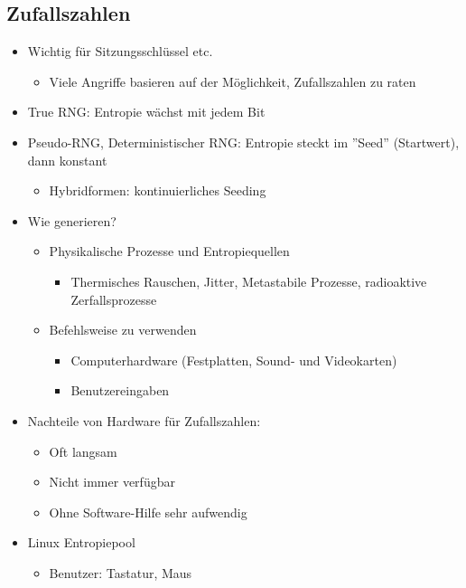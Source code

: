 \documentclass[openany]{book}
\begin{document}
\subsection{Zufallszahlen}

\begin{itemize}
    \item Wichtig für Sitzungsschlüssel etc.
    \begin{itemize}
        \item Viele Angriffe basieren auf der Möglichkeit, Zufallszahlen zu raten
    \end{itemize}
    \item True RNG: Entropie wächst mit jedem Bit
    \item Pseudo-RNG, Deterministischer RNG: Entropie steckt im ''Seed'' (Startwert), dann konstant
    \begin{itemize}
        \item Hybridformen: kontinuierliches Seeding
    \end{itemize}
    \item Wie generieren?
    \begin{itemize}
        \item Physikalische Prozesse und Entropiequellen
        \begin{itemize}
            \item Thermisches Rauschen, Jitter, Metastabile Prozesse, radioaktive Zerfallsprozesse
        \end{itemize}
        \item Befehlsweise zu verwenden
        \begin{itemize}
            \item Computerhardware (Festplatten, Sound- und Videokarten)
            \item Benutzereingaben
        \end{itemize}
    \end{itemize}
    \item Nachteile von Hardware für Zufallszahlen:
    \begin{itemize}
        \item Oft langsam
        \item Nicht immer verfügbar
        \item Ohne Software-Hilfe sehr aufwendig
    \end{itemize}
    \item Linux Entropiepool
    \begin{itemize}
        \item Benutzer: Tastatur, Maus

\end{itemize}
\end{itemize}
\end{document}
